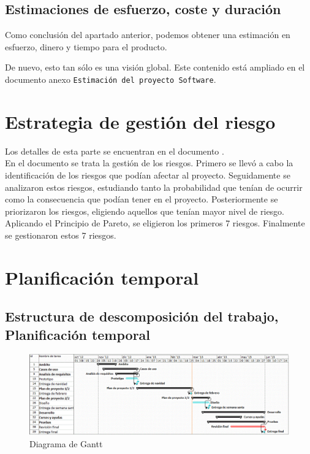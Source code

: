 \documentclass[spanish,a4paper,12pt]{report}	%
\begin{document}
	\section{Estimaciones de esfuerzo, coste y duración}
		Como conclusión del apartado anterior, podemos obtener una estimación en esfuerzo, dinero y tiempo para el producto.


		De nuevo, esto tan sólo es una visión global. Este contenido está ampliado en el
		documento anexo \texttt{Estimación del proyecto Software}.


\newpage
\mbox{}
\thispagestyle{empty}						%
\newpage
\setcounter{section}{0}

\chapter{Estrategia de gestión del riesgo}

	Los detalles de esta parte se encuentran en el documento .\\
	En el documento se trata la gestión de los riesgos. Primero se llevó a cabo la identificación de los riesgos que podían afectar al proyecto.
	Seguidamente se analizaron estos riesgos, estudiando tanto la probabilidad que tenían de ocurrir como la consecuencia que podían 
	tener en el proyecto. Posteriormente se priorizaron los riesgos, eligiendo aquellos que tenían mayor nivel de riesgo. Aplicando el Principio de Pareto, 
	se eligieron los primeros 7 riesgos.
	Finalmente se gestionaron estos 7 riesgos.

\newpage
\mbox{}
\thispagestyle{empty}						%
\newpage
\setcounter{section}{0}

\chapter{Planificación temporal}

	\section{Estructura de descomposición del trabajo, Planificación temporal}

	\begin{figure}[!h]
	\centering
	\includegraphics[scale=0.57]{GraficoGantt.png}
	\caption{Diagrama de Gantt}
	\end{figure}
\end{document}
